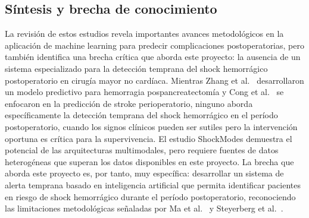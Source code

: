 \documentclass[12pt, letterpaper]{article}
\begin{document}
\subsection{Síntesis y brecha de conocimiento}

La revisión de estos estudios revela importantes avances metodológicos en la aplicación de machine learning para predecir complicaciones postoperatorias, pero también identifica una brecha crítica que aborda este proyecto: la ausencia de un sistema especializado para la detección temprana del shock hemorrágico postoperatorio en cirugía mayor no cardíaca. Mientras Zhang et al.\ \cite{zhang2025} desarrollaron un modelo predictivo para hemorragia pospancreatectomía y Cong et al.\ \cite{cong2025} se enfocaron en la predicción de stroke perioperatorio, ninguno aborda específicamente la detección temprana del shock hemorrágico en el período postoperatorio, cuando los signos clínicos pueden ser sutiles pero la intervención oportuna es crítica para la supervivencia. El estudio ShockModes \cite{pal2022} demuestra el potencial de las arquitecturas multimodales, pero requiere fuentes de datos heterogéneas que superan los datos disponibles en este proyecto. La brecha que aborda este proyecto es, por tanto, muy específica: desarrollar un sistema de alerta temprana basado en inteligencia artificial que permita identificar pacientes en riesgo de shock hemorrágico durante el período postoperatorio, reconociendo las limitaciones metodológicas señaladas por Ma et al.\ \cite{ma2023} y Steyerberg et al.\ \cite{steyerberg2018}.
\end{document}

